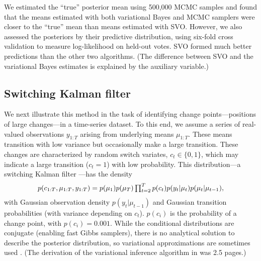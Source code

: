 We estimated the ``true'' posterior mean using 500,000 MCMC samples
and found that the means estimated with both variational Bayes and
MCMC samplers were closer to the ``true'' mean than means estimated
with SVO.  However, we also assessed the posteriors by their
predictive distribution, using six-fold cross validation to measure
log-likelihood on held-out votes.  SVO formed much better predictions
than the other two algorithms. (The difference between SVO and the
variational Bayes estimates is explained by the auxiliary variable.)


\subsection{Switching Kalman filter}
\label{sec:switching_kalman_filter}
We next illustrate this method in the task of identifying change
points---positions of large changes---in a time-series dataset.  To
this end, we assume a series of real-valued observations $y_{1:T}$
arising from underlying means $\mu_{1:T}$.  These means transition
with low variance but occasionally make a large transition.  These changes
are characterized by random switch variates, $c_t \in \{ 0, 1 \}$,
which may indicate a large transition ($c_t=1$) with low probability. This
distribution---a switching Kalman filter \citep{murphy:1998}---has the
density
\begin{align}
  \vspace{-14pt}
  p(c_{1:T}, \mu_{1:T}, y_{1:T}) = p(\mu_1) p(\mu_T) \textstyle
  \prod_{t=2}^T p(c_t) p(y_t | \mu_t) p(\mu_t | \mu_{t-1}),
\end{align}
with Gaussian observation density $p(y_t | \mu_{t-1})$ and Gaussian
transition probabilities (with variance depending on $c_t$).  $p(c_i)$
is the probability of a change point, with $p(c_i) = 0.001$. While the
conditional distributions are conjugate (enabling fast Gibbs
samplers), there is no analytical solution to describe the posterior
distribution, so variational approximations are sometimes used
\citep{ghahramani:1996,murphy:1998}.  (The derivation of the
variational inference algorithm in \cite{ghahramani:1996} was 2.5
pages.)

